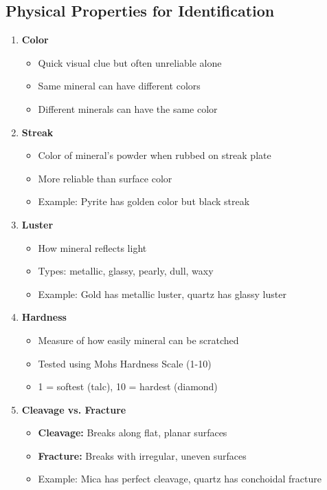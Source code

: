 \documentclass{article}
\begin{document}
\subsection{Physical Properties for Identification}

\begin{enumerate}
    \item \textbf{Color}
    \begin{itemize}
        \item Quick visual clue but often unreliable alone
        \item Same mineral can have different colors
        \item Different minerals can have the same color
    \end{itemize}
    
    \item \textbf{Streak}
    \begin{itemize}
        \item Color of mineral's powder when rubbed on streak plate
        \item More reliable than surface color
        \item Example: Pyrite has golden color but black streak
    \end{itemize}
    
    \item \textbf{Luster}
    \begin{itemize}
        \item How mineral reflects light
        \item Types: metallic, glassy, pearly, dull, waxy
        \item Example: Gold has metallic luster, quartz has glassy luster
    \end{itemize}
    
    \item \textbf{Hardness}
    \begin{itemize}
        \item Measure of how easily mineral can be scratched
        \item Tested using Mohs Hardness Scale (1-10)
        \item 1 = softest (talc), 10 = hardest (diamond)
    \end{itemize}
    
    \item \textbf{Cleavage vs. Fracture}
    \begin{itemize}
        \item \textbf{Cleavage:} Breaks along flat, planar surfaces
        \item \textbf{Fracture:} Breaks with irregular, uneven surfaces
        \item Example: Mica has perfect cleavage, quartz has conchoidal fracture
    \end{itemize}
    

\end{enumerate}
\end{document}
